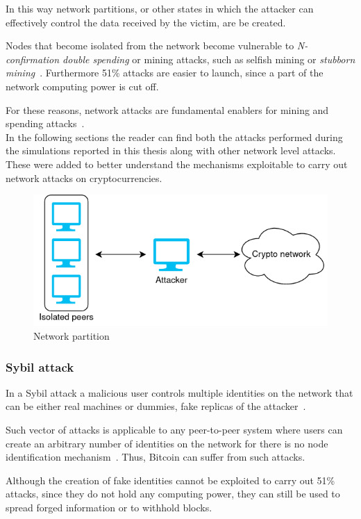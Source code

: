 \documentclass[12pt, letterpaper, twoside]{article}
\begin{document}
In this way network partitions, or other states in which the attacker can effectively control the data received by the victim, are be created.

Nodes that become isolated from the network become vulnerable to \textit{N-confirmation double spending} or mining attacks, such as selfish mining or \textit{stubborn mining}~\cite{stubborn}. Furthermore 51\% attacks are easier to launch, since a part of the network computing power is cut off. 

For these reasons, network attacks are fundamental enablers for mining and spending attacks~\cite{dotan2020surveychallenges}.\\

In the following sections the reader can find both the attacks performed during the simulations reported in this thesis along with other network level attacks. These were added to better understand the mechanisms exploitable to carry out network attacks on cryptocurrencies.

\begin{figure}[h!]
	\includegraphics[width=.55\textwidth]{pict/network-partition.png}
	\centering
	\caption{Network partition}
	\label{fig:net-part}
\end{figure}


\subsubsection{Sybil attack}\label{sec:sybil}
In a Sybil attack a malicious user controls multiple identities on the network that can be either real machines or dummies, fake replicas of the attacker~\cite{douceur2002sybil}.

Such vector of attacks is applicable to any peer-to-peer system where users can create an arbitrary number of identities on the network for there is no node identification mechanism~\cite{kedziora-sybil-ledgers}. Thus, Bitcoin can suffer from such attacks.

Although the creation of fake identities cannot be exploited to carry out 51\% attacks, since they do not hold any computing power, they can still be used to spread forged information or to withhold blocks.
\end{document}
